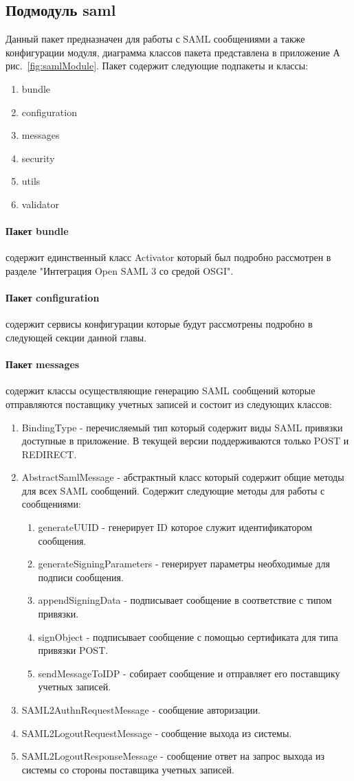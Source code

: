\subsection{Подмодуль saml} 
Данный пакет предназначен для работы с SAML сообщениями а также конфигурации модуля, диаграмма классов пакета представлена в приложение А рис.~\ref{fig:samlModule}. Пакет содержит следующие подпакеты и классы:
\begin{enumerate}
\item bundle
\item configuration
\item messages
\item security
\item utils
\item validator
\end{enumerate}

\paragraph{Пакет bundle} содержит единственный класс Activator который был подробно рассмотрен в разделе "Интеграция Open SAML 3 со средой OSGI".
\paragraph{Пакет configuration} содержит сервисы конфигурации которые будут рассмотрены подробно в следующей секции данной главы.
\paragraph{Пакет messages} содержит классы осуществляющие генерацию SAML сообщений которые отправляются поставщику учетных записей и состоит из следующих классов:
\begin{enumerate}
\item BindingType - перечисляемый тип который содержит виды SAML привязки доступные в приложение. В текущей версии поддерживаются только POST и REDIRECT.
\item AbstractSamlMessage - абстрактный класс который содержит общие методы для всех SAML сообщений. Содержит следующие методы для работы с сообщениями:
\begin{enumerate}
\item generateUUID - генерирует ID которое служит идентификатором сообщения.
\item generateSigningParameters - генерирует параметры необходимые для подписи сообщения.
\item appendSigningData - подписывает сообщение в соответствие с типом привязки.
\item signObject - подписывает сообщение с помощью сертификата для типа привязки POST.
\item sendMessageToIDP - собирает сообщение и отправляет его поставщику учетных записей.
\end{enumerate}
\item SAML2AuthnRequestMessage - сообщение авторизации.
\item SAML2LogoutRequestMessage - сообщение выхода из системы.
\item SAML2LogoutResponseMessage - сообщение ответ на запрос выхода из системы со стороны поставщика учетных записей.
\end{enumerate}
